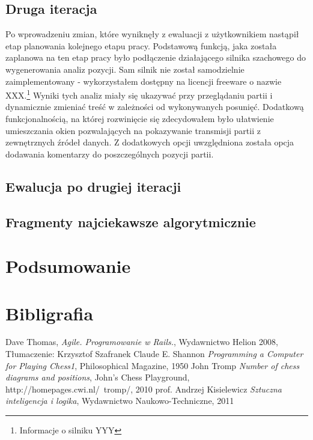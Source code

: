 \documentclass[12pt,leqno]{article}
\begin{document}
\subsection{Druga iteracja}
Po wprowadzeniu zmian, które wyniknęły z ewaluacji z użytkownikiem nastąpił etap planowania kolejnego etapu pracy. Podstawową funkcją, jaka została zaplanowa na ten etap pracy było podłączenie działającego silnika szachowego do wygenerowania analiz pozycji. Sam silnik nie został samodzielnie zaimplementowany - wykorzystałem dostępny na licencji freeware o nazwie XXX.\footnote{Informacje o silniku YYY} Wyniki tych analiz miały się ukazywać przy przeglądaniu partii i dynamicznie zmieniać treść w zależności od wykonywanych posunięć. Dodatkową funkcjonalnością, na której rozwinięcie się zdecydowałem było ułatwienie umieszczania okien pozwalających na pokazywanie transmisji partii z zewnętrznych źródeł danych. Z dodatkowych opcji uwzględniona została opcja dodawania komentarzy do poszczególnych pozycji partii. 

\subsection{Ewalucja po drugiej iteracji}

\subsection{Fragmenty najciekawsze algorytmicznie}




\section{Podsumowanie}

\section{Bibligrafia}
\begin{thebibliography}{1}
	 Dave Thomas, \textit{Agile. Programowanie w Rails.}, Wydawnictwo Helion 2008, Tłumaczenie: Krzysztof Szafranek
	 Claude E. Shannon \textit{Programming a Computer for Playing Chess1}, Philosophical Magazine, 1950
	 John Tromp \textit{Number of chess diagrams and positions}, John's Chess Playground, http://homepages.cwi.nl/~tromp/,  2010
	 prof.  Andrzej Kisielewicz \textit{Sztuczna inteligencja i logika}, Wydawnictwo Naukowo-Techniczne,  2011
\end{thebibliography}
\end{document}
